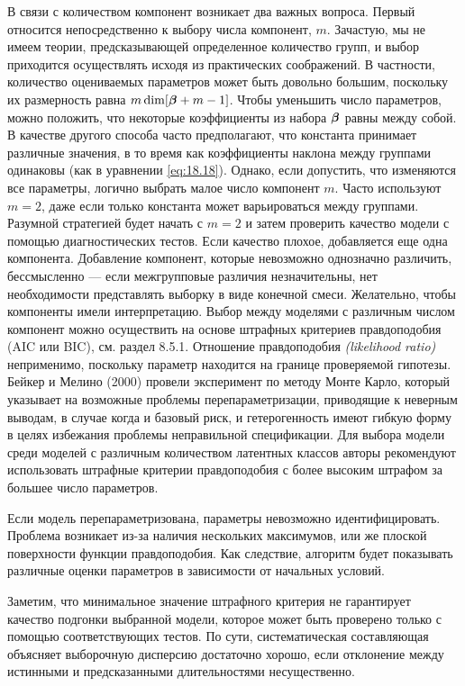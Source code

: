 \noindent
В связи с количеством компонент возникает два важных вопроса. Первый относится непосредственно к выбору числа компонент, $m$. Зачастую, мы не имеем теории, предсказывающей определенное количество групп, и выбор приходится осуществлять исходя из практических соображений. В частности, количество оцениваемых параметров может быть довольно большим, поскольку их размерность равна $m\dim[\bm{\beta} + m -1]$. Чтобы уменьшить число параметров, можно положить, что некоторые коэффициенты из набора $\bm{\beta}$ равны между собой. В качестве другого способа часто предполагают, что константа принимает различные значения, в то время как коэффициенты наклона между группами одинаковы (как в уравнении \ref{eq:18.18}). Однако, если допустить, что изменяются все параметры, логично выбрать малое число компонент $m$. Часто используют $m = 2$, даже если только константа может варьироваться между группами. Разумной стратегией будет начать с $m = 2$ и затем проверить качество модели с помощью диагностических тестов. Если качество плохое, добавляется еще одна компонента. Добавление компонент, которые невозможно однозначно различить, бессмысленно --- если межгрупповые различия незначительны, нет необходимости представлять выборку в виде конечной смеси. Желательно, чтобы компоненты имели интерпретацию. Выбор между моделями с различным числом компонент можно осуществить на основе штрафных критериев правдоподобия (AIC или BIC), см. раздел 8.5.1. %
Отношение правдоподобия \textit{(likelihood ratio)} неприменимо, поскольку параметр находится на границе проверяемой гипотезы.
Бейкер и Мелино (2000) провели эксперимент по методу Монте Карло, который указывает на возможные проблемы перепараметризации, приводящие к неверным выводам, в случае когда и базовый риск, и гетерогенность имеют гибкую форму в целях избежания проблемы неправильной спецификации.
Для выбора модели среди моделей с различным количеством латентных классов авторы рекомендуют использовать штрафные критерии правдоподобия с более высоким штрафом за большее число параметров.

Если модель перепараметризована, параметры невозможно идентифицировать. Проблема возникает из-за наличия нескольких максимумов, или же плоской поверхности функции правдоподобия. Как следствие, алгоритм будет показывать %
различные оценки параметров в зависимости от начальных условий.

Заметим, что минимальное значение штрафного критерия не гарантирует качество подгонки выбранной модели, которое может быть проверено только с помощью соответствующих тестов. По сути, систематическая составляющая объясняет выборочную дисперсию достаточно хорошо, если отклонение между истинными и предсказанными длительностями несущественно.

